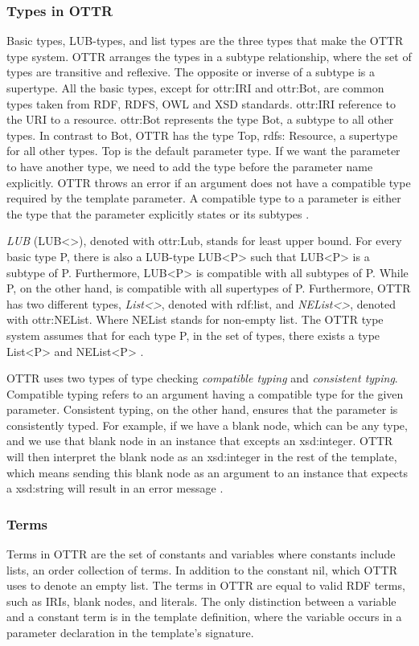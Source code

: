 \subsubsection{Types in OTTR}
\label{ottr types} 
Basic types, LUB-types, and list types are the three types that make the OTTR type system. OTTR arranges the types in a subtype relationship, where the set of types are transitive and reflexive. The opposite or inverse of a subtype is a supertype. All the basic types, except for ottr:IRI and ottr:Bot, are common types taken from RDF, RDFS, OWL and XSD standards. ottr:IRI reference to the URI to a resource. ottr:Bot represents the type Bot, a subtype to all other types. In contrast to Bot, OTTR has the type Top, rdfs: Resource, a supertype for all other types.  Top is the default parameter type. If we want the parameter to have another type, we need to add the type before the parameter name explicitly. OTTR throws an error if an argument does not have a compatible type required by the template parameter.  A compatible type to a parameter is either the type that the parameter explicitly states or its subtypes \autocite[5-6]{SLKK_OTTR_2021}.

\para
\emph{LUB} (LUB<>), denoted with ottr:Lub, stands for least upper bound. For every basic type P, there is also a LUB-type LUB<P> such that LUB<P> is a subtype of P. Furthermore, LUB<P> is compatible with all subtypes of P. While P, on the other hand, is compatible with all supertypes of P. Furthermore, OTTR has two different types, \emph{List<>}, denoted with rdf:list, and \emph{NEList<>}, denoted with ottr:NEList. Where NEList stands for non-empty list. The OTTR type system assumes that for each type P, in the set of types, there exists a type List<P> and NEList<P> \autocite[5]{SLKK_OTTR_2021}.

\para
OTTR uses two types of type checking \emph{compatible typing} and \emph{consistent typing}. Compatible typing refers to an argument having a compatible type for the given parameter. Consistent typing, on the other hand, ensures that the parameter is consistently typed. For example, if we have a blank node, which can be any type, and we use that blank node in an instance that excepts an xsd:integer. OTTR will then interpret the blank node as an xsd:integer in the rest of the template, which means sending this blank node as an argument to an instance that expects a xsd:string will result in an error message \autocite[5-6]{SLKK_OTTR_2021}. 

\subsubsection{Terms}
Terms in OTTR are the set of constants and variables where constants include lists, an order collection of terms. In addition to the constant nil, which OTTR uses to denote an empty list. The terms in OTTR are equal to valid RDF terms, such as IRIs, blank nodes, and literals. The only distinction between a variable and a constant term is in the template definition, where the variable occurs in a parameter declaration in the template's signature.\autocite{OTTR_mOTTR}
